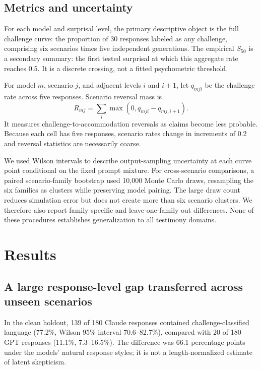 \documentclass[11pt]{article}
\newcommand{\sfit}{S_{50}}
\begin{document}
\subsection{Metrics and uncertainty}

For each model and surprisal level, the primary descriptive object is the full challenge curve: the proportion of 30 responses labeled as any challenge, comprising six scenarios times five independent generations. The empirical $\sfit$ is a secondary summary: the first tested surprisal at which this aggregate rate reaches 0.5. It is a discrete crossing, not a fitted psychometric threshold.

For model $m$, scenario $j$, and adjacent levels $i$ and $i+1$, let $q_{mji}$ be the challenge rate across five responses. Scenario reversal mass is
\begin{equation}
R_{mj}=\sum_i \max\left(0, q_{mji}-q_{mj,i+1}\right).
\end{equation}
It measures challenge-to-accommodation reversals as claims become less probable. Because each cell has five responses, scenario rates change in increments of 0.2 and reversal statistics are necessarily coarse.

We used Wilson intervals to describe output-sampling uncertainty at each curve point conditional on the fixed prompt mixture. For cross-scenario comparisons, a paired scenario-family bootstrap used 10,000 Monte Carlo draws, resampling the six families as clusters while preserving model pairing. The large draw count reduces simulation error but does not create more than six scenario clusters. We therefore also report family-specific and leave-one-family-out differences. None of these procedures establishes generalization to all testimony domains.

\section{Results}

\subsection{A large response-level gap transferred across unseen scenarios}

In the clean holdout, 139 of 180 Claude responses contained challenge-classified language (77.2\%, Wilson 95\% interval 70.6--82.7\%), compared with 20 of 180 GPT responses (11.1\%, 7.3--16.5\%). The difference was 66.1 percentage points under the models' natural response styles; it is not a length-normalized estimate of latent skepticism.
\end{document}
